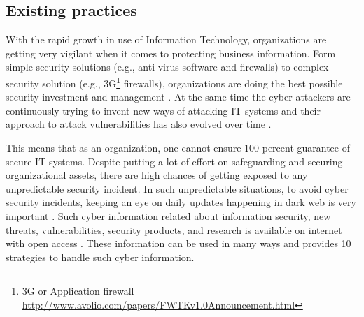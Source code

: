 \subsection{Existing practices}\label{Existing-practices}

With the rapid growth in use of Information Technology, organizations are getting very vigilant when it comes to protecting business information. Form simple security solutions (e.g., anti-virus software and firewalls) to complex security solution (e.g., 3G\footnote{3G or Application firewall \url{http://www.avolio.com/papers/FWTKv1.0Announcement.html}} firewalls), organizations are doing the best possible security investment and management \citep{yeh2007threats}. 
At the same time the cyber attackers are continuously trying to invent new ways of attacking IT systems and their approach to attack vulnerabilities has also evolved over time \citep{jang2014survey}. 

This means that as an organization, one cannot ensure 100 percent guarantee of secure IT systems. Despite putting a lot of effort on safeguarding and securing organizational assets, there are high chances of getting exposed to any unpredictable security incident. In such unpredictable situations, to avoid cyber security incidents, keeping an eye on daily updates happening in dark web is very important \citep{chen2006intelligence}. 
Such cyber information related about information security, new threats, vulnerabilities, security products, and research is available on internet with open access \citep{fogelman2008mining}. These information can be used in many ways and
 \cite{zimmerman2014ten} provides 10 strategies to handle such cyber information.

